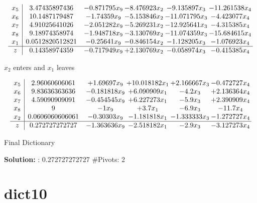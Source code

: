 \documentclass[10pt]{article}
\begin{document}
 \[\begin{array}{c| c c@{\hskip 2pt} c@{\hskip 2pt} c@{\hskip 2pt} c@{\hskip 2pt} }
 x_{5}   &  3.47435897436 & -0.871795 x_{9} & -8.476923 x_{2} & -9.135897 x_{3} & -11.261538 x_{4}\\
 x_{6}   &  10.1487179487 & -1.74359 x_{9} & -5.153846 x_{2} & -11.071795 x_{3} & -4.423077 x_{4}\\
 x_{7}   &  4.91025641026 & -2.051282 x_{9} & -5.269231 x_{2} & -12.925641 x_{3} & -4.315385 x_{4}\\
 x_{8}   &  9.18974358974 & -1.948718 x_{9} & -3.130769 x_{2} & -11.074359 x_{3} & -15.684615 x_{4}\\
 x_{1}   &  0.0512820512821 & -0.25641 x_{9} & -0.846154 x_{2} & -1.128205 x_{3} & -1.076923 x_{4}\\
\hline
z    &  0.14358974359 & -0.717949 x_{9} & + 2.130769 x_{2} & -0.058974 x_{3} & -0.415385 x_{4}\\
\end{array}\]


 $ x_{2} $ enters and $ x_{1} $ leaves 

 \[\begin{array}{c| c c@{\hskip 2pt} c@{\hskip 2pt} c@{\hskip 2pt} c@{\hskip 2pt} }
 x_{5}   &  2.96060606061 & + 1.69697 x_{9} & + 10.018182 x_{1} & + 2.166667 x_{3} & -0.472727 x_{4}\\
 x_{6}   &  9.83636363636 & -0.181818 x_{9} & + 6.090909 x_{1} & -4.2 x_{3} & + 2.136364 x_{4}\\
 x_{7}   &  4.59090909091 & -0.454545 x_{9} & + 6.227273 x_{1} & -5.9 x_{3} & + 2.390909 x_{4}\\
 x_{8}   &  9 & -1  x_{9} & + 3.7 x_{1} & -6.9 x_{3} & -11.7 x_{4}\\
 x_{2}   &  0.0606060606061 & -0.30303 x_{9} & -1.181818 x_{1} & -1.333333 x_{3} & -1.272727 x_{4}\\
\hline
z    &  0.272727272727 & -1.363636 x_{9} & -2.518182 x_{1} & -2.9 x_{3} & -3.127273 x_{4}\\
\end{array}\]


 Final Dictionary
\par \noindent\textbf{Solution:} :  0.272727272727
\#Pivots:  2
\section{dict10}
\end{document}
